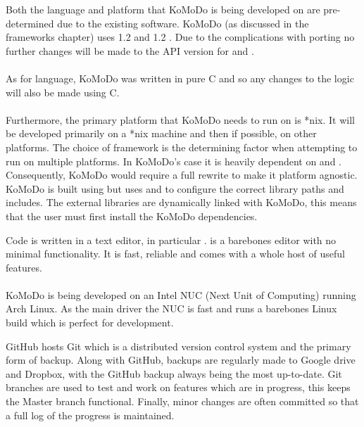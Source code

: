   Both the language and platform that KoMoDo is being developed on are pre-determined due to the existing software. KoMoDo (as discussed in the frameworks chapter) uses  1.2 and  1.2 . Due to the complications with porting no further changes will be made to the API version for  and .\\\\
  As for language, KoMoDo was written in pure C and so any changes to the logic will also be made using C.\\\\
  Furthermore, the primary platform that KoMoDo needs to run on is *nix. It will be developed primarily on a *nix machine and then if possible, on other platforms. The choice of framework is the determining factor when attempting to run on multiple platforms. In KoMoDo's case it is heavily dependent on  and . Consequently, KoMoDo would require a full rewrite to make it platform agnostic.
  KoMoDo is built using  but uses  and  to configure the correct library paths and includes. The external libraries are dynamically linked with KoMoDo, this means that the user must first install the KoMoDo dependencies.

  Code is written in a text editor, in particular .  is a barebones editor with no minimal functionality. It is fast, reliable and comes with a whole host of useful features.\\\\
  KoMoDo is being developed on an Intel NUC (Next Unit of Computing) running Arch Linux. As the main driver the NUC is fast and runs a barebones Linux build which is perfect for development.

  GitHub hosts Git which is a distributed version control system and the primary form of backup. Along with GitHub, backups are regularly made to Google drive and Dropbox, with the GitHub backup always being the most up-to-date. Git branches are used to test and work on features which are in progress, this keeps the Master branch functional. Finally, minor changes are often committed so that a full log of the progress is maintained.

